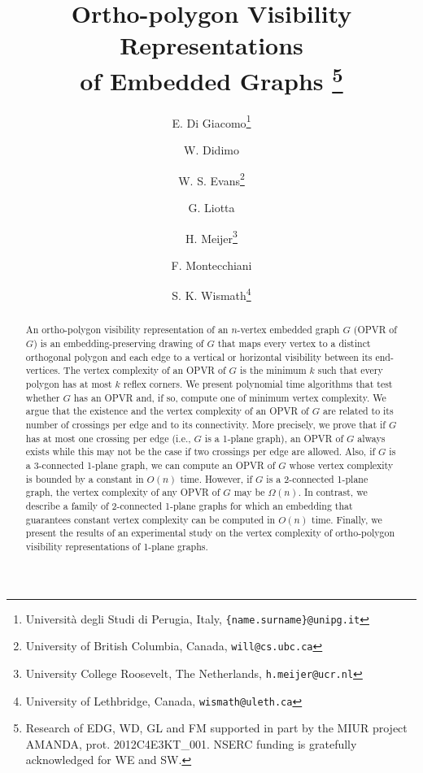 \documentclass{article}
\newcommand{\opvr}{OPVR\xspace}
\begin{document}
\title{Ortho-polygon Visibility Representations\\of Embedded Graphs
\thanks{Research of EDG, WD, GL and FM  supported in part by the MIUR project AMANDA, prot. 2012C4E3KT\_001. NSERC funding is gratefully acknowledged for WE and SW.}}




\author{E. Di Giacomo\thanks{Universit{\`a} degli Studi di Perugia, Italy, \texttt{\{name.surname\}@unipg.it}} \and W. Didimo\footnotemark[1] \and W. S. Evans\thanks{University of British Columbia, Canada, \texttt{will@cs.ubc.ca}} \and G. Liotta\footnotemark[1] \and H. Meijer\thanks{University College Roosevelt, The Netherlands, \texttt{h.meijer@ucr.nl}} \and F. Montecchiani\footnotemark[1] \and S. K. Wismath\thanks{University of Lethbridge, Canada, \texttt{wismath@uleth.ca}}}

\date{}


\maketitle


\begin{abstract}
An ortho-polygon visibility representation of an $n$-vertex embedded graph $G$ (\opvr of $G$) is an embedding-preserving drawing of $G$ that maps every vertex  to a distinct orthogonal polygon and each edge to a vertical or horizontal visibility between its end-vertices. The vertex complexity of an \opvr of $G$ is the minimum $k$ such that every polygon has at most $k$ reflex corners. We present polynomial time algorithms that test whether $G$ has an \opvr and, if so, compute one of minimum vertex complexity. We argue that the existence and the vertex complexity of an \opvr of $G$ are related to its number of crossings per edge and to its connectivity. More precisely, we prove that if $G$ has at most one crossing per edge (i.e., $G$ is a 1-plane graph), an \opvr of $G$ always exists while this may not be the case if two crossings per edge are allowed. Also, if $G$ is a 3-connected 1-plane graph,  we can compute  an  \opvr of $G$ whose vertex complexity is bounded by a constant in $O(n)$ time. However, if $G$ is a 2-connected 1-plane graph, the vertex complexity of any \opvr of $G$  may be $\Omega(n)$. In contrast, we describe a family of 2-connected 1-plane graphs for which an embedding that guarantees constant vertex complexity can be computed in $O(n)$ time. Finally, we present the results of an experimental study on the vertex complexity of ortho-polygon visibility representations of 1-plane graphs.

\end{abstract}
\end{document}
